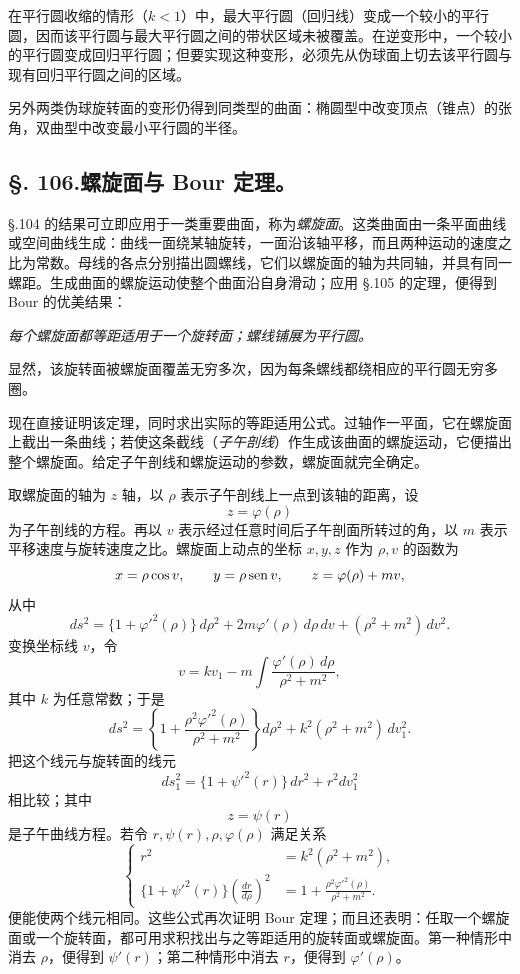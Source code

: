 在平行圆收缩的情形（\(k<1\)）中，最大平行圆（回归线）变成一个较小的平行圆，因而该平行圆与最大平行圆之间的带状区域未被覆盖。在逆变形中，一个较小的平行圆变成回归平行圆；但要实现这种变形，必须先从伪球面上切去该平行圆与现有回归平行圆之间的区域。

另外两类伪球旋转面的变形仍得到同类型的曲面：椭圆型中改变顶点（锥点）的张角，双曲型中改变最小平行圆的半径。

\subsection*{\S. 106.\quad 螺旋面与 Bour 定理。}

\S.104 的结果可立即应用于一类重要曲面，称为\emph{螺旋面}。这类曲面由一条平面曲线或空间曲线生成：曲线一面绕某轴旋转，一面沿该轴平移，而且两种运动的速度之比为常数。母线的各点分别描出圆螺线，它们以螺旋面的轴为共同轴，并具有同一螺距。生成曲面的螺旋运动使整个曲面沿自身滑动；应用 \S.105 的定理，便得到 Bour 的优美结果：

\emph{每个螺旋面都等距适用于一个旋转面；螺线铺展为平行圆。}

显然，该旋转面被螺旋面覆盖无穷多次，因为每条螺线都绕相应的平行圆无穷多圈。

现在直接证明该定理，同时求出实际的等距适用公式。过轴作一平面，它在螺旋面上截出一条曲线；若使这条截线（\emph{子午剖线}）作生成该曲面的螺旋运动，它便描出整个螺旋面。给定子午剖线和螺旋运动的参数，螺旋面就完全确定。

取螺旋面的轴为 \(z\) 轴，以 \(\rho\) 表示子午剖线上一点到该轴的距离，设
\[
 z=\varphi(\rho)
\]
为子午剖线的方程。再以 \(v\) 表示经过任意时间后子午剖面所转过的角，以 \(m\) 表示平移速度与旋转速度之比。螺旋面上动点的坐标 \(x,y,z\) 作为 \(\rho,v\) 的函数为
\[
 x=\rho\cos v,
 \qquad y=\rho\operatorname{sen} v,
 \qquad z=\varphi(\rho)+mv,
\]
从中
\[
 ds^2=\{1+\varphi'^2(\rho)\}\,d\rho^2+2m\varphi'(\rho)\,d\rho\,dv+(\rho^2+m^2)\,dv^2.
\]
变换坐标线 \(v\)，令
\[
 v=kv_1-m\int\frac{\varphi'(\rho)\,d\rho}{\rho^2+m^2},
\]
其中 \(k\) 为任意常数；于是
\[
 ds^2=\left\{1+\frac{\rho^2\varphi'^2(\rho)}{\rho^2+m^2}\right\}d\rho^2+k^2(\rho^2+m^2)\,dv_1^2.
\]
把这个线元与旋转面的线元
\[
 ds_1^2=\{1+\psi'^2(r)\}\,dr^2+r^2dv_1^2
\]
相比较；其中
\[
 z=\psi(r)
\]
是子午曲线方程。若令 \(r,\psi(r),\rho,\varphi(\rho)\) 满足关系
\begin{equation}\tag{8}
\left\{
\begin{aligned}
 r^2&=k^2(\rho^2+m^2),\\
 \{1+\psi'^2(r)\}\left(\frac{dr}{d\rho}\right)^2
 &=1+\frac{\rho^2\varphi'^2(\rho)}{\rho^2+m^2}.
\end{aligned}
\right.
\end{equation}
便能使两个线元相同。这些公式再次证明 Bour 定理；而且还表明：任取一个螺旋面或一个旋转面，都可用求积找出与之等距适用的旋转面或螺旋面。第一种情形中消去 \(\rho\)，便得到 \(\psi'(r)\)；第二种情形中消去 \(r\)，便得到 \(\varphi'(\rho)\)。

